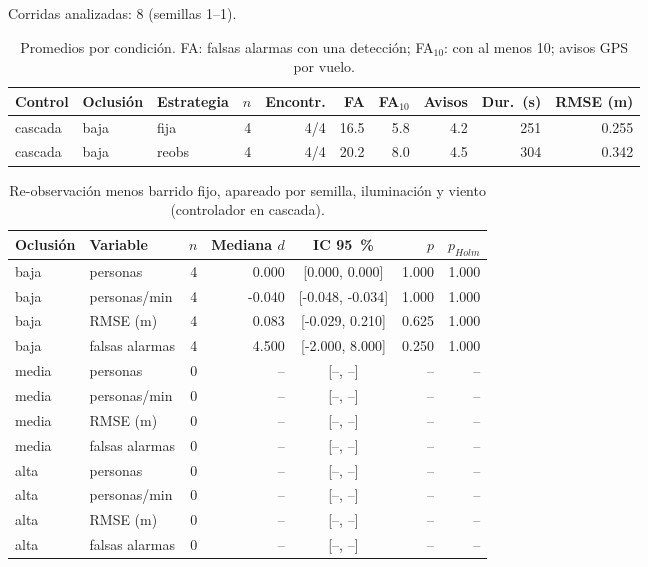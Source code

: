 Corridas analizadas: 8 (semillas 1--1).
\begin{table}[H]\centering\small\setlength{\tabcolsep}{4pt}
\begin{tabular}{lllrrrrrrr}
\toprule
\textbf{Control} & \textbf{Oclusión} & \textbf{Estrategia} & $n$ & \textbf{Encontr.} & \textbf{FA} & \textbf{FA$_{10}$} & \textbf{Avisos} & \textbf{Dur.\ (s)} & \textbf{RMSE (m)} \\ \midrule
cascada & baja & fija & 4 & 4/4 & 16.5 & 5.8 & 4.2 & 251 & 0.255 \\
cascada & baja & reobs & 4 & 4/4 & 20.2 & 8.0 & 4.5 & 304 & 0.342 \\
\bottomrule
\end{tabular}
\caption{Promedios por condición. FA: falsas alarmas con una detección; FA$_{10}$: con al menos 10; avisos GPS por vuelo.}
\label{tab:campana-medias}
\end{table}
\begin{table}[H]\centering\small
\begin{tabular}{llrrcrr}
\toprule
\textbf{Oclusión} & \textbf{Variable} & $n$ & \textbf{Mediana $d$} & \textbf{IC 95~\%} & $p$ & $p_{Holm}$ \\ \midrule
baja & personas & 4 & 0.000 & [0.000, 0.000] & 1.000 & 1.000 \\
baja & personas/min & 4 & -0.040 & [-0.048, -0.034] & 1.000 & 1.000 \\
baja & RMSE (m) & 4 & 0.083 & [-0.029, 0.210] & 0.625 & 1.000 \\
baja & falsas alarmas & 4 & 4.500 & [-2.000, 8.000] & 0.250 & 1.000 \\
media & personas & 0 & -- & [--, --] & -- & -- \\
media & personas/min & 0 & -- & [--, --] & -- & -- \\
media & RMSE (m) & 0 & -- & [--, --] & -- & -- \\
media & falsas alarmas & 0 & -- & [--, --] & -- & -- \\
alta & personas & 0 & -- & [--, --] & -- & -- \\
alta & personas/min & 0 & -- & [--, --] & -- & -- \\
alta & RMSE (m) & 0 & -- & [--, --] & -- & -- \\
alta & falsas alarmas & 0 & -- & [--, --] & -- & -- \\
\bottomrule
\end{tabular}
\caption{Re-observación menos barrido fijo, apareado por semilla, iluminación y viento (controlador en cascada).}
\label{tab:campana-wilcoxon}
\end{table}
